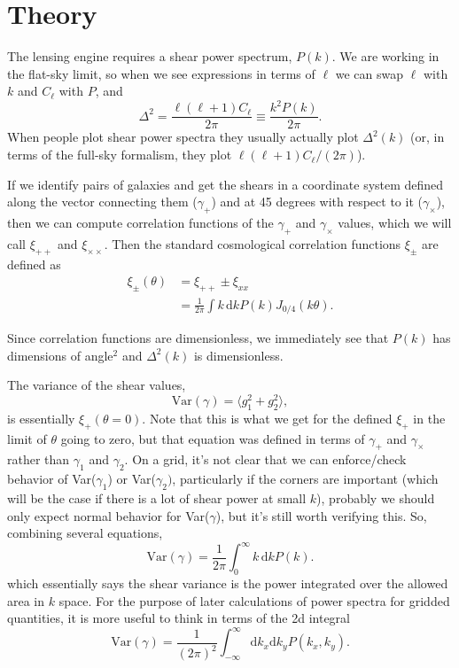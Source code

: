 \documentclass[preprint]{aastex}
\newcommand{\rmd}{\ensuremath{\mathrm{d}}}
\newcommand{\beq}{\begin{equation}}
\newcommand{\eeq}{\end{equation}}
\begin{document}
\section{Theory}\label{sect:theory}

The lensing engine requires a shear power spectrum, $P(k)$.  We are
working in the flat-sky limit, so when we see expressions in terms of
$\ell$ we can swap $\ell$ with $k$ and $C_\ell$ with $P$, and
\beq
\Delta^2 = \frac{\ell(\ell+1) C_{\ell}}{2\pi}\equiv \frac{k^2 P(k)}{2\pi}.
\eeq
When people plot shear power spectra they usually actually plot
$\Delta^2(k)$ (or, in terms of the full-sky formalism, they plot $\ell(\ell+1)C_\ell/(2\pi)$).

If we identify pairs of galaxies and get the shears in a coordinate
system defined along the vector connecting them ($\gamma_+$) and at 45
degrees with respect to it ($\gamma_\times$), then we can compute
correlation functions of the $\gamma_+$ and $\gamma_\times$ values,
which we will call $\xi_{++}$ and $\xi_{\times\times}$.  Then the
standard cosmological correlation functions $\xi_{\pm}$ are defined as
\begin{align}
\xi_{\pm}(\theta) &=  \xi_{++}\pm \xi_{xx} \\
 &= \frac{1}{2\pi}\int k\,\rmd k P(k) J_{0/4}(k\theta).  \label{eq:xi}
\end{align}

Since correlation functions are dimensionless, we immediately see that
$P(k)$ has dimensions of angle$^2$ and $\Delta^2(k)$ is dimensionless.

The variance of the shear values, 
\beq
\mathrm{Var}(\gamma) = \langle g_1^2 + g_2^2\rangle,
\eeq
is essentially $\xi_+(\theta=0)$.   Note that this is what we get for
the defined $\xi_+$ in the limit of $\theta$ going to zero, but that
equation was defined in terms of $\gamma_+$ and $\gamma_\times$ rather
than $\gamma_1$ and $\gamma_2$.  On a grid, it's not clear that we
can enforce/check behavior of Var($\gamma_1$) or Var($\gamma_2)$,
particularly if the corners are important (which will be the case if
there is a lot of shear power at small $k$), probably we should 
 only expect normal behavior for Var($\gamma$), but it's still worth
 verifying this.  So, combining several equations,
\beq\label{E:shearvar}
\mathrm{Var}(\gamma) = \frac{1}{2\pi}\int_0^{\infty} k\,\rmd k P(k).
\eeq
which essentially says the shear variance is the power integrated over
the allowed area in $k$ space.  For the purpose of later calculations
of power spectra for gridded quantities, it is more useful to think in
terms of the 2d integral
\beq\label{E:alt-shearvar}
\mathrm{Var}(\gamma) = \frac{1}{(2\pi)^2} \int_{-\infty}^{\infty} \rmd k_x \rmd k_y
P(k_x, k_y).
\eeq
\end{document}
